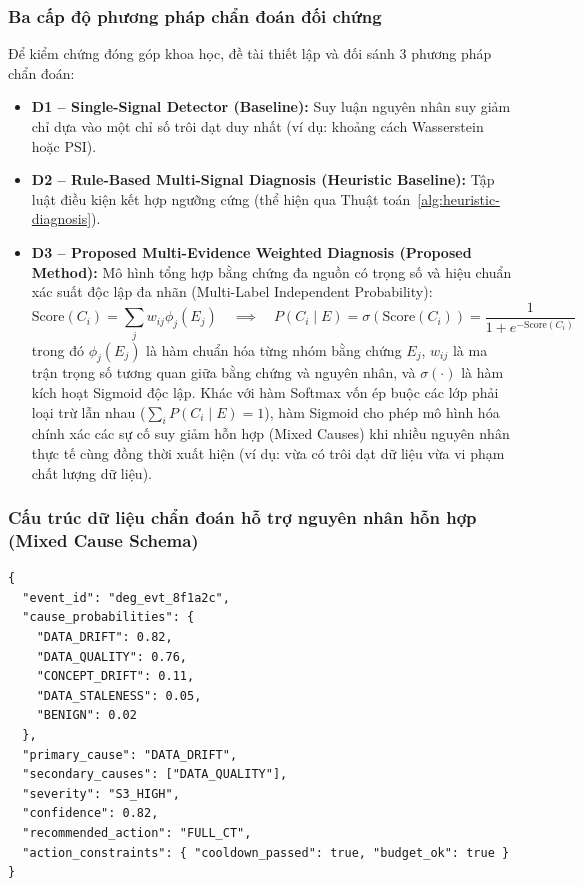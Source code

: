 \subsubsection{Ba cấp độ phương pháp chẩn đoán đối chứng}
Để kiểm chứng đóng góp khoa học, đề tài thiết lập và đối sánh 3 phương pháp chẩn đoán:
\begin{itemize}
  \item \textbf{D1 -- Single-Signal Detector (Baseline):} Suy luận nguyên nhân suy giảm chỉ dựa vào một chỉ số trôi dạt duy nhất (ví dụ: khoảng cách Wasserstein hoặc PSI).
  \item \textbf{D2 -- Rule-Based Multi-Signal Diagnosis (Heuristic Baseline):} Tập luật điều kiện kết hợp ngưỡng cứng (thể hiện qua Thuật toán~\ref{alg:heuristic-diagnosis}).
  \item \textbf{D3 -- Proposed Multi-Evidence Weighted Diagnosis (Proposed Method):} Mô hình tổng hợp bằng chứng đa nguồn có trọng số và hiệu chuẩn xác suất độc lập đa nhãn (Multi-Label Independent Probability):
  $$\text{Score}(C_i) = \sum_j w_{ij} \phi_j(E_j) \quad \implies \quad P(C_i \mid E) = \sigma(\text{Score}(C_i)) = \frac{1}{1 + e^{-\text{Score}(C_i)}}$$
  trong đó $\phi_j(E_j)$ là hàm chuẩn hóa từng nhóm bằng chứng $E_j$, $w_{ij}$ là ma trận trọng số tương quan giữa bằng chứng và nguyên nhân, và $\sigma(\cdot)$ là hàm kích hoạt Sigmoid độc lập. Khác với hàm Softmax vốn ép buộc các lớp phải loại trừ lẫn nhau ($\sum_i P(C_i \mid E) = 1$), hàm Sigmoid cho phép mô hình hóa chính xác các sự cố suy giảm hỗn hợp (Mixed Causes) khi nhiều nguyên nhân thực tế cùng đồng thời xuất hiện (ví dụ: vừa có trôi dạt dữ liệu vừa vi phạm chất lượng dữ liệu).
\end{itemize}

\subsubsection{Cấu trúc dữ liệu chẩn đoán hỗ trợ nguyên nhân hỗn hợp (Mixed Cause Schema)}
\begin{tcolorbox}[colback=gray!4!white,colframe=gray!45!black,arc=2pt,boxrule=0.5pt,top=3pt,bottom=3pt,left=5pt,right=5pt]
\small
\begin{verbatim}
{
  "event_id": "deg_evt_8f1a2c",
  "cause_probabilities": {
    "DATA_DRIFT": 0.82,
    "DATA_QUALITY": 0.76,
    "CONCEPT_DRIFT": 0.11,
    "DATA_STALENESS": 0.05,
    "BENIGN": 0.02
  },
  "primary_cause": "DATA_DRIFT",
  "secondary_causes": ["DATA_QUALITY"],
  "severity": "S3_HIGH",
  "confidence": 0.82,
  "recommended_action": "FULL_CT",
  "action_constraints": { "cooldown_passed": true, "budget_ok": true }
}
\end{verbatim}
\end{tcolorbox}

